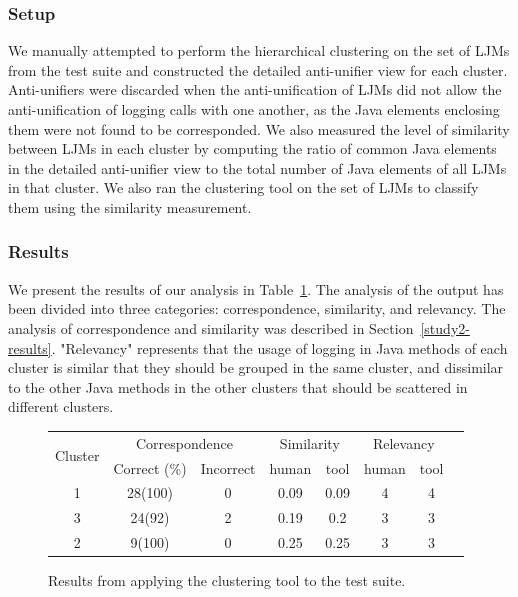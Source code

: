 \subsubsection{Setup}  \label{study3-setup}
We manually attempted to perform the hierarchical clustering on the set of LJMs from the test suite and constructed the detailed anti-unifier view for each cluster. Anti-unifiers were discarded when the anti-unification of LJMs did not allow the anti-unification of logging calls with one another, as the Java elements enclosing them were not found to be corresponded. We also measured the level of similarity between LJMs in each cluster by computing the ratio of common Java elements in the detailed anti-unifier view to the total number of Java elements of all LJMs in that cluster. We also ran the clustering tool on the set of LJMs to classify them using the similarity measurement.

\subsubsection{Results}  \label{study3-results}
We present the results of our analysis in Table~\ref{results_clustering}. The analysis of the output has been divided into three categories: correspondence, similarity, and relevancy. The analysis of correspondence and similarity was described in Section~\ref{study2-results}. "Relevancy" represents that the usage of logging in Java methods of each cluster is similar that they should be grouped in the same cluster, and dissimilar to the other Java methods in the other clusters that should be scattered in different clusters. 


\begin{figure}
  \centering
  \begin{tabular}{|c|c|c|c|c|c|c|c|}
    \hline
  
    \multirow{2}{*}{Cluster}&\multicolumn{2}{c|}{Correspondence}&\multicolumn{2}{c|}{Similarity}&\multicolumn{2}{c|}{Relevancy}\\
    \cline{2-7}
    &Correct (\%)&Incorrect&human&tool&human&tool\\
    \hline
    1&28(100)&0&0.09&0.09  &4&4\\
    \hline
    3&24(92)&2&0.19&0.2& 3&3\\
    \hline
      2&9(100)&0&0.25&0.25& 3&3\\
 	\hline
  \end{tabular}
  \caption{Results from applying the clustering tool to the test suite.}
  \label{results_clustering}
\end{figure}

